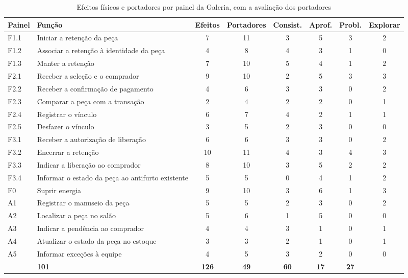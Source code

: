 \begin{table}[H]
    \centering
    \caption{Efeitos físicos e portadores por painel da Galeria, com a avaliação dos portadores}
    \label{tab:aprov_galeria}
    \footnotesize
    \renewcommand{\arraystretch}{1.2}
    \begin{tabularx}{\textwidth}{@{}
        >{\RaggedRight\arraybackslash}p{1.0cm}
        >{\RaggedRight\arraybackslash}X
        c c c c c c@{}}
        \toprule
        \textbf{Painel} & \textbf{Função} & \textbf{Efeitos} & \textbf{Portadores} & \textbf{Consist.} & \textbf{Aprof.} & \textbf{Probl.} & \textbf{Explorar} \\
        \midrule
        F1.1 & Iniciar a retenção da peça & 7 & 11 & 3 & 5 & 3 & 2 \\
        F1.2 & Associar a retenção à identidade da peça & 4 & 8 & 4 & 3 & 1 & 0 \\
        F1.3 & Manter a retenção & 7 & 10 & 5 & 4 & 1 & 2 \\
        F2.1 & Receber a seleção e o comprador & 9 & 10 & 2 & 5 & 3 & 3 \\
        F2.2 & Receber a confirmação de pagamento & 4 & 6 & 3 & 3 & 0 & 2 \\
        F2.3 & Comparar a peça com a transação & 2 & 4 & 2 & 2 & 0 & 1 \\
        F2.4 & Registrar o vínculo & 6 & 7 & 4 & 2 & 1 & 1 \\
        F2.5 & Desfazer o vínculo & 3 & 5 & 2 & 3 & 0 & 0 \\
        F3.1 & Receber a autorização de liberação & 6 & 6 & 3 & 3 & 0 & 2 \\
        F3.2 & Encerrar a retenção & 10 & 11 & 4 & 3 & 4 & 3 \\
        F3.3 & Indicar a liberação ao comprador & 8 & 10 & 3 & 5 & 2 & 2 \\
        F3.4 & Informar o estado da peça ao antifurto existente & 5 & 5 & 0 & 4 & 1 & 2 \\
        F0 & Suprir energia & 9 & 10 & 3 & 6 & 1 & 3 \\
        \midrule
        A1 & Registrar o manuseio da peça & 5 & 5 & 2 & 3 & 0 & 2 \\
        A2 & Localizar a peça no salão & 5 & 6 & 1 & 5 & 0 & 0 \\
        A3 & Indicar a pendência ao comprador & 4 & 4 & 3 & 1 & 0 & 1 \\
        A4 & Atualizar o estado da peça no estoque & 3 & 3 & 2 & 1 & 0 & 1 \\
        A5 & Informar exceções à equipe & 4 & 5 & 3 & 2 & 0 & 0 \\
        \midrule
        \multicolumn{2}{@{}l}{\textbf{Total}} & \textbf{101} & \textbf{126} & \textbf{49} & \textbf{60} & \textbf{17} & \textbf{27} \\
        \bottomrule
    \end{tabularx}
\end{table}

